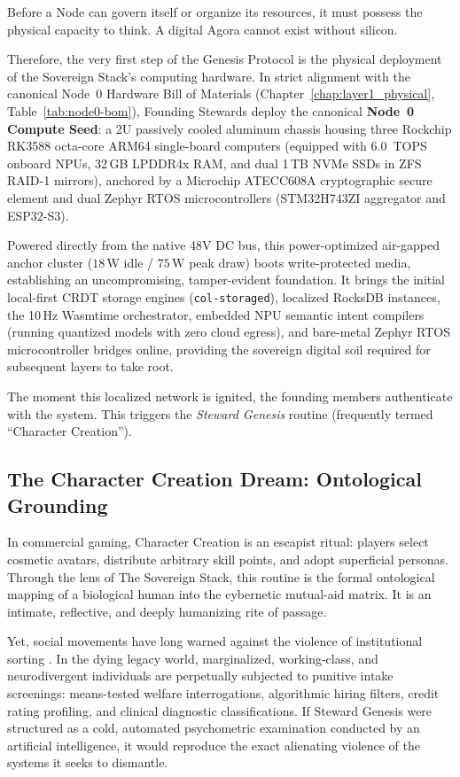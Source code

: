 Before a Node can govern itself or organize its resources, it must possess the physical capacity to think. A digital Agora cannot exist without silicon. 

Therefore, the very first step of the Genesis Protocol is the physical deployment of the Sovereign Stack's computing hardware. In strict alignment with the canonical Node~0 Hardware Bill of Materials (Chapter~\ref{chap:layer1_physical}, Table~\ref{tab:node0-bom}), Founding Stewards deploy the canonical \textbf{Node~0 Compute Seed}: a 2U passively cooled aluminum chassis housing three Rockchip RK3588 octa-core ARM64 single-board computers (equipped with 6.0~TOPS onboard NPUs, 32\,GB LPDDR4x RAM, and dual 1\,TB NVMe SSDs in ZFS RAID-1 mirrors), anchored by a Microchip ATECC608A cryptographic secure element and dual Zephyr RTOS microcontrollers (STM32H743ZI aggregator and ESP32-S3).

Powered directly from the native 48V DC bus, this power-optimized air-gapped anchor cluster ($18\,\mathrm{W}$ idle / $75\,\mathrm{W}$ peak draw) boots write-protected media, establishing an uncompromising, tamper-evident foundation. It brings the initial local-first CRDT storage engines (\texttt{col-storaged}), localized RocksDB instances, the 10\,Hz Wasmtime orchestrator, embedded NPU semantic intent compilers (running quantized models with zero cloud egress), and bare-metal Zephyr RTOS microcontroller bridges online, providing the sovereign digital soil required for subsequent layers to take root.

The moment this localized network is ignited, the founding members authenticate with the system. This triggers the \textit{Steward Genesis} routine (frequently termed ``Character Creation'').

\subsection{The Character Creation Dream: Ontological Grounding}

In commercial gaming, Character Creation is an escapist ritual: players select cosmetic avatars, distribute arbitrary skill points, and adopt superficial personas. Through the lens of The Sovereign Stack, this routine is the formal ontological mapping of a biological human into the cybernetic mutual-aid matrix. It is an intimate, reflective, and deeply humanizing rite of passage.

Yet, social movements have long warned against the violence of institutional sorting \parencite{noble2018, bender2021parrots}. In the dying legacy world, marginalized, working-class, and neurodivergent individuals are perpetually subjected to punitive intake screenings: means-tested welfare interrogations, algorithmic hiring filters, credit rating profiling, and clinical diagnostic classifications. If Steward Genesis were structured as a cold, automated psychometric examination conducted by an artificial intelligence, it would reproduce the exact alienating violence of the systems it seeks to dismantle.

